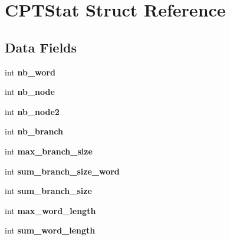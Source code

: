 \hypertarget{structCPTStat}{}\section{C\+P\+T\+Stat Struct Reference}
\label{structCPTStat}
\subsection*{Data Fields}
\begin{DoxyCompactItemize}
\item 
int {\bfseries nb\+\_\+word}\hypertarget{structCPTStat_a58ac2be00efae25c2327d9633b0012d4}{}\label{structCPTStat_a58ac2be00efae25c2327d9633b0012d4}

\item 
int {\bfseries nb\+\_\+node}\hypertarget{structCPTStat_a2fe3f9ca6e2298de8fe583d1998cfa8b}{}\label{structCPTStat_a2fe3f9ca6e2298de8fe583d1998cfa8b}

\item 
int {\bfseries nb\+\_\+node2}\hypertarget{structCPTStat_a1f2b46fe4d9376cb139ac2828467bfce}{}\label{structCPTStat_a1f2b46fe4d9376cb139ac2828467bfce}

\item 
int {\bfseries nb\+\_\+branch}\hypertarget{structCPTStat_af76928968bae2b707f069814504b5045}{}\label{structCPTStat_af76928968bae2b707f069814504b5045}

\item 
int {\bfseries max\+\_\+branch\+\_\+size}\hypertarget{structCPTStat_ae20f9509f4998f41157167b0eb7065b4}{}\label{structCPTStat_ae20f9509f4998f41157167b0eb7065b4}

\item 
int {\bfseries sum\+\_\+branch\+\_\+size\+\_\+word}\hypertarget{structCPTStat_adaea66ddd9de22bf900d0eeeb5486eac}{}\label{structCPTStat_adaea66ddd9de22bf900d0eeeb5486eac}

\item 
int {\bfseries sum\+\_\+branch\+\_\+size}\hypertarget{structCPTStat_a3b3e8fa6689f9725a871430adddf0f30}{}\label{structCPTStat_a3b3e8fa6689f9725a871430adddf0f30}

\item 
int {\bfseries max\+\_\+word\+\_\+length}\hypertarget{structCPTStat_ab03796b9949b9a21fa98a901390ca619}{}\label{structCPTStat_ab03796b9949b9a21fa98a901390ca619}

\item 
int {\bfseries sum\+\_\+word\+\_\+length}\hypertarget{structCPTStat_a8db546c8f4954a69815d75a4ab62a884}{}\label{structCPTStat_a8db546c8f4954a69815d75a4ab62a884}


\end{DoxyCompactItemize}
